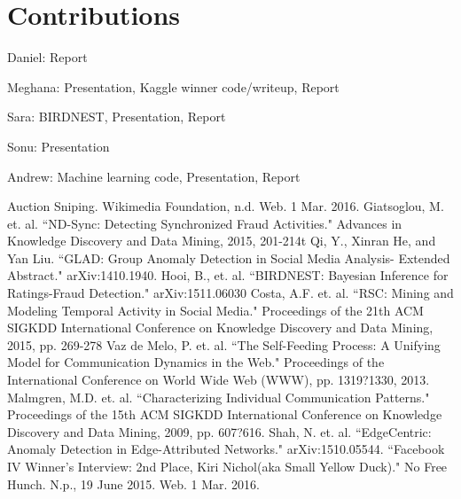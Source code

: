 \documentclass{article} %
\begin{document}
\section{Contributions}

Daniel: Report

Meghana: Presentation, Kaggle winner code/writeup, Report

Sara: BIRDNEST, Presentation, Report

Sonu: Presentation

Andrew: Machine learning code, Presentation, Report

\begin{thebibliography}{123}

 Auction Sniping. Wikimedia Foundation, n.d. Web. 1 Mar. 2016.
 Giatsoglou, M. et. al. ``ND-Sync: Detecting Synchronized Fraud Activities." Advances in Knowledge Discovery and Data Mining, 2015, 201-214t
 Qi, Y., Xinran He, and Yan Liu. ``GLAD: Group Anomaly Detection in Social Media Analysis- Extended Abstract." arXiv:1410.1940.
 Hooi, B., et. al. ``BIRDNEST: Bayesian Inference for Ratings-Fraud Detection." arXiv:1511.06030
 Costa, A.F. et. al. ``RSC: Mining and Modeling Temporal Activity in Social Media." Proceedings of the 21th ACM SIGKDD International Conference on Knowledge Discovery and Data Mining, 2015, pp. 269-278
 Vaz de Melo, P. et. al. ``The Self-Feeding Process: A Unifying Model for Communication Dynamics in the Web." Proceedings of the International Conference on World Wide Web (WWW), pp. 1319?1330, 2013.
 Malmgren, M.D. et. al. ``Characterizing Individual Communication Patterns." Proceedings of the 15th ACM SIGKDD International Conference on Knowledge Discovery and Data Mining, 2009, pp. 607?616.
 Shah, N. et. al. ``EdgeCentric: Anomaly Detection in Edge-Attributed Networks." arXiv:1510.05544.
 ``Facebook IV Winner's Interview: 2nd Place, Kiri Nichol(aka Small Yellow Duck)." No Free Hunch. N.p., 19 June 2015. Web. 1 Mar. 2016.

\end{thebibliography}
\end{document}
